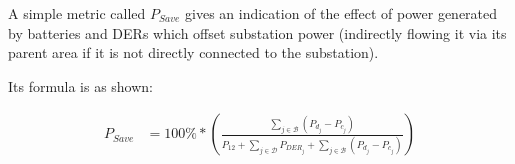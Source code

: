 A simple metric called $P_{Save}$ gives an indication of the effect of power
generated by batteries and DERs which offset substation power 
(indirectly flowing it via its parent area if it is not directly connected to 
the substation).

Its formula is as shown:

\begin{align}
	{P_{Save}} &= {100\% * \left(\frac{\sum_{j \in \mathcal{B}}\left( P_{d_j} - P_{c_j} \right)}{P_{12} + 
	\sum_{j \in \mathcal{D}} P_{DER_j} +  \sum_{j \in \mathcal{B}}\left( P_{d_j} - P_{c_j} \right)} \right)}
\end{align}
